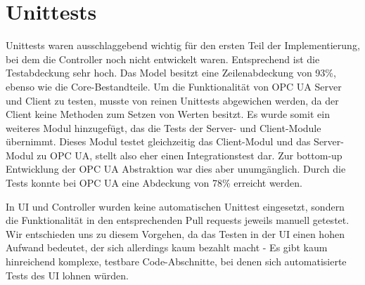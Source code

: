 \documentclass[parskip=full]{scrartcl}
\begin{document}
\section{Unittests}
Unittests waren ausschlaggebend wichtig für den ersten Teil der Implementierung, bei dem die Controller noch nicht entwickelt waren.
Entsprechend ist die Testabdeckung sehr hoch. Das Model besitzt eine Zeilenabdeckung von 93\%, ebenso wie die Core-Bestandteile.
Um die Funktionalität von OPC UA Server und Client zu testen, musste von reinen Unittests abgewichen werden, da der Client keine
Methoden zum Setzen von Werten besitzt. Es wurde somit ein weiteres Modul hinzugefügt, das die Tests der Server- und Client-Module übernimmt.
Dieses Modul testet gleichzeitig das Client-Modul und das Server-Modul zu OPC UA, stellt also eher einen Integrationstest dar. Zur bottom-up
Entwicklung der OPC UA Abstraktion war dies aber unumgänglich. Durch die Tests konnte bei OPC UA eine Abdeckung von 78\% erreicht werden.

In UI und Controller wurden keine automatischen Unittest eingesetzt, sondern die Funktionalität in den entsprechenden Pull requests
jeweils manuell getestet. Wir entschieden uns zu diesem Vorgehen, da das Testen in der UI einen hohen Aufwand bedeutet, der sich allerdings
kaum bezahlt macht - Es gibt kaum hinreichend komplexe, testbare Code-Abschnitte, bei denen sich automatisierte Tests des UI lohnen würden.

\pagebreak
{}
{}
\listoffigures
\end{document}
